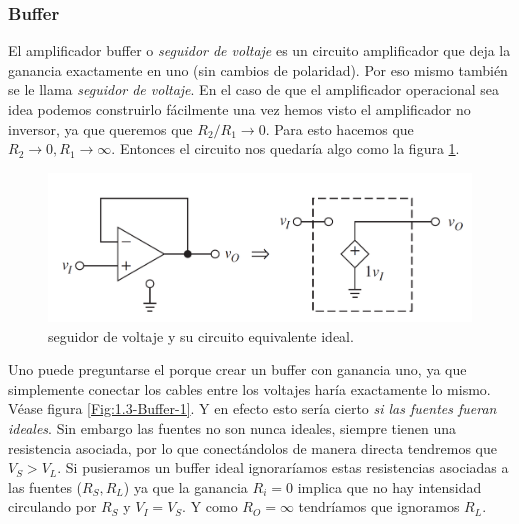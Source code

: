 \documentclass[11pt]{article} %
\begin{document}

\subsubsection{Buffer}

El amplificador buffer o \textit{seguidor de voltaje} es un circuito amplificador que deja la ganancia exactamente en uno (sin cambios de polaridad). Por eso mismo también se le llama \textit{seguidor de voltaje}. En el caso de que el amplificador operacional sea idea podemos construirlo fácilmente una vez hemos visto el amplificador no inversor, ya que queremos que $R_2/R_1 \rightarrow 0$. Para esto hacemos que $R_2 \rightarrow 0, R_1 \rightarrow \infty$. Entonces el circuito nos quedaría algo como la figura \ref{Fig:1.3-Buffer}. \\



\begin{figure}[t] \centering
\includegraphics[scale=0.4]{1.3-Buffer.png}
\caption{seguidor de voltaje y su circuito equivalente ideal.}
\label{Fig:1.3-Buffer}
\end{figure} 

Uno puede preguntarse el porque crear un buffer con ganancia uno, ya que simplemente conectar los cables entre los voltajes haría exactamente lo mismo. Véase figura \ref{Fig:1.3-Buffer-1}. Y en efecto esto sería cierto \textit{si las fuentes fueran ideales}. Sin embargo las fuentes no son nunca ideales, siempre tienen una resistencia asociada, por lo que conectándolos de manera directa tendremos que $V_S > V_L$. Si pusieramos un buffer ideal ignoraríamos estas resistencias asociadas a las fuentes ($R_S,R_L$) ya que la ganancia $R_i = 0$ implica que no hay intensidad circulando por $R_S$ y $V_I = V_S$. Y como $R_O = \infty$ tendríamos que ignoramos $R_L$.  \\
\end{document}
